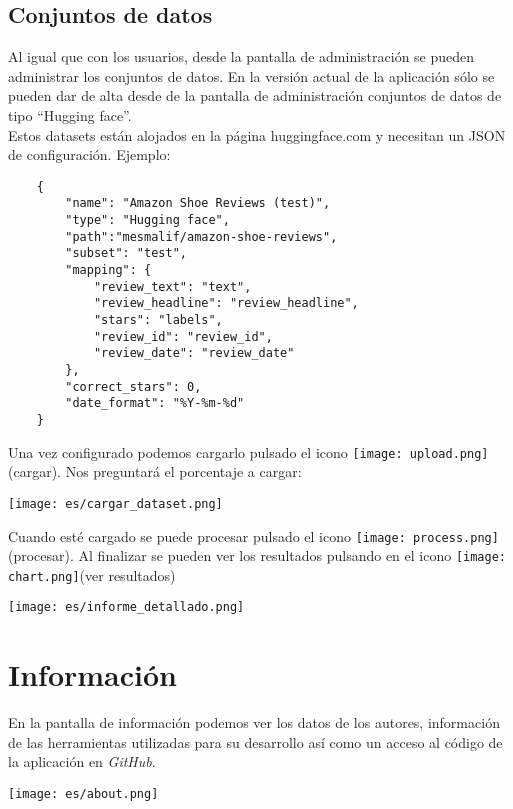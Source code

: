 \documentclass{ol-softwaremanual}
\begin{document}
\subsection{Conjuntos de datos}
Al igual que con los usuarios, desde la pantalla de administración se pueden administrar los conjuntos de datos.
En la versión actual de la aplicación sólo se pueden dar de alta desde de la pantalla de administración conjuntos de datos de tipo ``Hugging face''. \\Estos datasets están alojados en la página huggingface.com y necesitan un JSON de configuración.
Ejemplo:
\begin{verbatim}
    {         
        "name": "Amazon Shoe Reviews (test)",
        "type": "Hugging face",
        "path":"mesmalif/amazon-shoe-reviews",        
        "subset": "test",
        "mapping": {
            "review_text": "text",
            "review_headline": "review_headline",
            "stars": "labels",
            "review_id": "review_id",
            "review_date": "review_date"             
        },
        "correct_stars": 0,
        "date_format": "%Y-%m-%d"
    }
\end{verbatim}
Una vez configurado podemos cargarlo pulsado el icono \texttt{[image: upload.png]}(cargar).
Nos preguntará el porcentaje a cargar:

\vspace{20pt}
\centerline{\texttt{[image: es/cargar\_dataset.png]}}
\vspace{20pt}

Cuando esté cargado se puede procesar pulsado el icono \texttt{[image: process.png]}(procesar).
Al finalizar se pueden ver los resultados pulsando en el icono \texttt{[image: chart.png]}(ver resultados)

\vspace{20pt}
\centerline{\texttt{[image: es/informe\_detallado.png]}}
\vspace{20pt}
\newpage
\section{Información}
En la pantalla de información podemos ver los datos de los autores, información de las herramientas utilizadas para su desarrollo así como un acceso al código de la aplicación en \emph{GitHub}.

\vspace{20pt}
\centerline{\texttt{[image: es/about.png]}}
\vspace{20pt}
\end{document}
